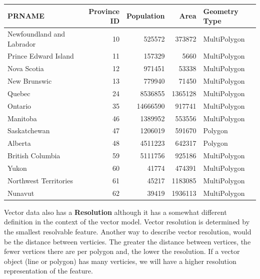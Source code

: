 \documentclass[
]{book}
\begin{document}
\begin{longtable}[]{@{}lrrrl@{}}
\toprule
PRNAME & Province ID & Population & Area & Geometry Type \\
\midrule
\endhead
Newfoundland and Labrador & 10 & 525572 & 373872 & MultiPolygon \\
Prince Edward Island & 11 & 157329 & 5660 & MultiPolygon \\
Nova Scotia & 12 & 971451 & 53338 & MultiPolygon \\
New Brunswic & 13 & 779940 & 71450 & MultiPolygon \\
Quebec & 24 & 8536855 & 1365128 & MultiPolygon \\
Ontario & 35 & 14666590 & 917741 & MultiPolygon \\
Manitoba & 46 & 1389952 & 553556 & MultiPolygon \\
Saskatchewan & 47 & 1206019 & 591670 & Polygon \\
Alberta & 48 & 4511223 & 642317 & Polygon \\
British Columbia & 59 & 5111756 & 925186 & MultiPolygon \\
Yukon & 60 & 41774 & 474391 & MultiPolygon \\
Northwest Territories & 61 & 45217 & 1183085 & MultiPolygon \\
Nunavut & 62 & 39419 & 1936113 & MultiPolygon \\
\bottomrule
\end{longtable}

Vector data also has a \textbf{Resolution} although it has a somewhat different definition in the context of the vector model. Vector resolution is determined by the smallest resolvable feature. Another way to describe vector resolution, would be the distance between verticies. The greater the distance between vertices, the fewer vertices there are per polygon and, the lower the resolution. If a vector object (line or polygon) has many verticies, we will have a higher resolution representation of the feature.
\end{document}
